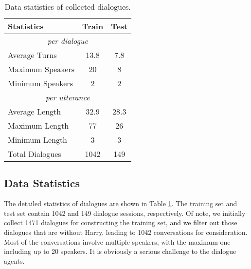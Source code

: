 \documentclass[11pt]{article}
\begin{document}
 \label{data_analysis}
\begin{table}[t]
    \begin{center}
    \centering
    \small
\begin{tabular}{lcc}
    \toprule
    Statistics& Train & Test \\
    \midrule
\multicolumn{3}{c}{\it{per dialogue}}\\
\midrule
    {Average Turns} &\multirow{1}{*}{13.8}&\multirow{1}{*}{7.8}  \\
     {Maximum Speakers}&\multirow{1}{*}{20}&\multirow{1}{*}{8}  \\
{Minimum Speakers}&\multirow{1}{*}{2}&\multirow{1}{*}{2}  \\
\midrule
\multicolumn{3}{c}{\it{per utterance}}\\
\midrule
     {Average Length }&\multirow{1}{*}{32.9}&\multirow{1}{*}{28.3}  \\
     
 {Maximum Length}&\multirow{1}{*}{77}&\multirow{1}{*}{26}  \\
      
    {Minimum Length }&\multirow{1}{*}{3}&\multirow{1}{*}{3}  \\
      \midrule
      
{Total Dialogues}&\multirow{1}{*}{1042}&\multirow{1}{*}{149}  \\
        

    


\bottomrule
    \end{tabular}
    \end{center}
    \caption{
        Data statistics of collected dialogues.
    }
    \label{tab:dialogues}
    \vspace{-15pt}
\end{table} 
\subsection{Data Statistics}
\label{data}




The detailed statistics of dialogues are shown in Table \ref{tab:dialogues}. The training set and test set contain 1042 and 149 dialogue sessions, respectively. Of note, we initially collect 1471 dialogues for constructing the training set, and we filter out those dialogues that are without Harry, leading to 1042 conversations for consideration. Most of the conversations involve multiple speakers, with the maximum one including up to 20 speakers. It is obviously a serious challenge to the dialogue agents.
\end{document}
